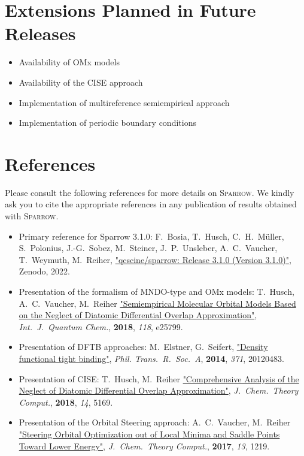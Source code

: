 \documentclass[]{tufte-book}
\begin{document}
\chapter{Extensions Planned in Future Releases}
\begin{itemize}
\item Availability of OMx models
\item Availability of the CISE approach
\item Implementation of multireference semiempirical approach
\item Implementation of periodic boundary conditions
\end{itemize}



\chapter{References}

Please consult the following references for more details on \textsc{Sparrow}.
We kindly ask you to cite the appropriate references in any publication of results obtained with \textsc{Sparrow}.
\vspace{1.0cm}

\begin{itemize}
\item Primary reference for Sparrow 3.1.0:
F.~Bosia, T.~Husch, C.~H.~M\"uller, S.~Polonius, J.-G.~Sobez, M.~Steiner, J.~P.~Unsleber, A.~C.~Vaucher, T.~Weymuth, M.~Reiher, \href{https://doi.org/10.5281/zenodo.3244105}{"qcscine/sparrow: Release 3.1.0 (Version 3.1.0)"}, Zenodo, 2022.
\item Presentation of the formalism of MNDO-type and OMx models: \newline
T.~Husch, A.~C.~Vaucher, M.~Reiher \href{https://doi.org/10.1002/qua.25799}{"Semiempirical Molecular Orbital Models Based on the Neglect of Diatomic Differential Overlap Approximation"}, \textit{Int.~J.~Quantum Chem.}, \textbf{2018}, \textit{118}, e25799.
\item Presentation of DFTB approaches: \newline
M.~Elstner, G.~Seifert, \href{https://doi.org/10.1098/rsta.2012.0483}{"Density functional tight binding"}, \textit{Phil. Trans.~R.~Soc.~A}, \textbf{2014}, \textit{371}, 20120483.
\item Presentation of CISE: \newline
T.~Husch, M.~Reiher \href{https://doi.org/10.1021/acs.jctc.8b00601}{"Comprehensive Analysis of the Neglect of Diatomic Differential Overlap Approximation"}, \textit{J.~Chem.~Theory Comput.}, \textbf{2018}, \textit{14}, 5169.
\item Presentation of the Orbital Steering approach: \newline
A.~C.~Vaucher, M.~Reiher
    \href{https://doi.org/10.1021/acs.jctc.7b00011}{"Steering Orbital
    Optimization out of Local Minima and Saddle Points Toward Lower Energy"},
    \textit{J.~Chem.~Theory Comput.}, \textbf{2017}, \textit{13}, 1219.
\end{itemize}
\end{document}
